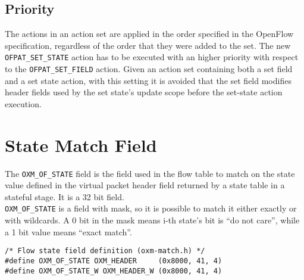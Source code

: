 \subsection{Priority}

The actions in an action set are applied in the order specified in the OpenFlow specification, regardless of the order that
they were added to the set. The new \texttt{OFPAT\_SET\_STATE} action has to be executed with an higher priority with respect to the \texttt{OFPAT\_SET\_FIELD} action. Given an action set containing both a set field and a set state action, with this setting it is avoided that the set field modifies header fields used by the set state's update scope before the set-state action execution.


\section{State Match Field}
\label{sec:match_state}

The \texttt{OXM\_OF\_STATE} field is the field used in the flow table to match on the state value defined in the virtual packet header field returned by a state table in a stateful stage. It is a 32 bit field.
\\
\texttt{OXM\_OF\_STATE} is a field with mask, so it is possible to match it either exactly or with wildcards. A 0 bit in the mask means i-th state's bit is ``do not care'', while a 1 bit value means ``exact match''.

\scriptsize
\begin{verbatim}
/* Flow state field definition (oxm-match.h) */
#define OXM_OF_STATE OXM_HEADER     (0x8000, 41, 4)
#define OXM_OF_STATE_W OXM_HEADER_W (0x8000, 41, 4)
\end{verbatim}
\normalsize

